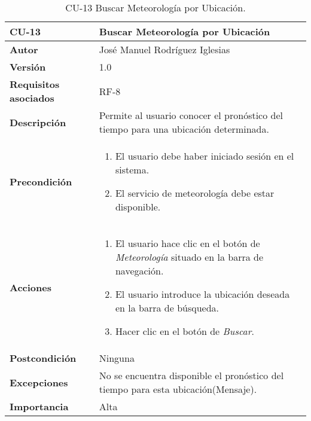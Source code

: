 \begin{table}[h]
	\centering
	\begin{tabularx}{\linewidth}{ p{} p{} }
		\toprule
		\textbf{CU-13}    & \textbf{Buscar Meteorología por Ubicación}\\
		\toprule
            \textbf{Autor}                & José Manuel Rodríguez Iglesias \\
		\textbf{Versión}              & 1.0    \\
		\textbf{Requisitos asociados} & RF-8 \\
		\textbf{Descripción}          & Permite al usuario conocer el pronóstico del tiempo para una ubicación determinada. \\
		\textbf{Precondición}         &  
            \begin{enumerate}
			\def\labelenumi{\arabic{enumi}.}
			\tightlist
			\item El usuario debe haber iniciado sesión en el sistema.
			\item El servicio de meteorología debe estar disponible.
		\end{enumerate}\\
    
		\textbf{Acciones}             &
		\begin{enumerate}
			\def\labelenumi{\arabic{enumi}.}
			\tightlist
                \item El usuario hace clic en el botón de\textit{ Meteorología} situado en la barra de navegación.
			\item El usuario introduce la ubicación deseada en la barra de búsqueda. 
                \item Hacer clic en el botón de \textit{Buscar}.
		\end{enumerate}\\
		\textbf{Postcondición}        & Ninguna \\
		\textbf{Excepciones}          & No se encuentra disponible el pronóstico del tiempo para esta ubicación(Mensaje). \\
		\textbf{Importancia}          & Alta\\
		\bottomrule
	\end{tabularx}
	\caption{CU-13 Buscar Meteorología por Ubicación.}
\end{table}

